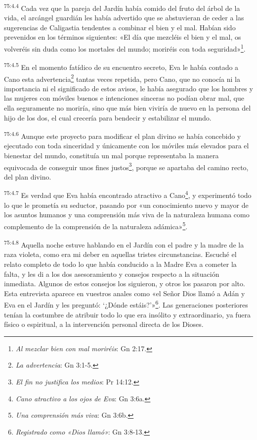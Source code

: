\par
\textsuperscript{75:4.4} Cada vez que la pareja del Jardín había comido del fruto del árbol de la vida, el arcángel guardián les había advertido que se abstuvieran de ceder a las sugerencias de Caligastia tendentes a combinar el bien y el mal. Habían sido prevenidos en los términos siguientes: «El día que mezcléis el bien y el mal, os volveréis sin duda como los mortales del mundo; moriréis con toda seguridad»\footnote{\textit{Al mezclar bien con mal moriréis}: Gn 2:17.}.

\par
\textsuperscript{75:4.5} En el momento fatídico de su encuentro secreto, Eva le había contado a Cano esta advertencia\footnote{\textit{La advertencia}: Gn 3:1-5.} tantas veces repetida, pero Cano, que no conocía ni la importancia ni el significado de estos avisos, le había asegurado que los hombres y las mujeres con móviles buenos e intenciones sinceras no podían obrar mal, que ella seguramente no moriría, sino que más bien viviría de nuevo en la persona del hijo de los dos, el cual crecería para bendecir y estabilizar el mundo.

\par
\textsuperscript{75:4.6} Aunque este proyecto para modificar el plan divino se había concebido y ejecutado con toda sinceridad y únicamente con los móviles más elevados para el bienestar del mundo, constituía un mal porque representaba la manera equivocada de conseguir unos fines justos\footnote{\textit{El fin no justifica los medios}: Pr 14:12.}, porque se apartaba del camino recto, del plan divino.

\par
\textsuperscript{75:4.7} Es verdad que Eva había encontrado atractivo a Cano\footnote{\textit{Cano atractivo a los ojos de Eva}: Gn 3:6a.}, y experimentó todo lo que le prometía su seductor, pasando por «un conocimiento nuevo y mayor de los asuntos humanos y una comprensión más viva de la naturaleza humana como complemento de la comprensión de la naturaleza adámica»\footnote{\textit{Una comprensión más viva}: Gn 3:6b.}.

\par
\textsuperscript{75:4.8} Aquella noche estuve hablando en el Jardín con el padre y la madre de la raza violeta, como era mi deber en aquellas tristes circunstancias. Escuché el relato completo de todo lo que había conducido a la Madre Eva a cometer la falta, y les di a los dos asesoramiento y consejos respecto a la situación inmediata. Algunos de estos consejos los siguieron, y otros los pasaron por alto. Esta entrevista aparece en vuestros anales como «el Señor Dios llamó a Adán y Eva en el Jardín y les preguntó:
`¿Dónde estáis?'»\footnote{\textit{Registrado como «Dios llamó»}: Gn 3:8-13.}. Las generaciones posteriores tenían la costumbre de atribuir todo lo que era insólito y extraordinario, ya fuera físico o espiritual, a la intervención personal directa de los Dioses.

